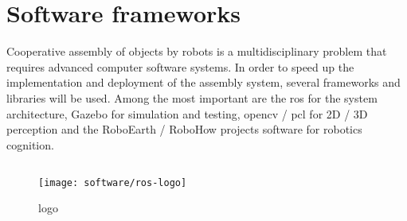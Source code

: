 %



\section{Software frameworks}

Cooperative assembly of objects by robots is a multidisciplinary problem that requires advanced computer software systems. In order to speed up the implementation and deployment of the assembly system, several frameworks and libraries will be used. Among the most important are the \gls{ros} for the system architecture, Gazebo for simulation and testing, \gls{opencv} / \gls{pcl} for 2D / 3D perception and the RoboEarth / RoboHow projects software for robotics cognition.

\subsection{}

\begin{wrapfigure}{r}{0.23\textwidth}
	\centering
	\vspace*{-2em}
	\texttt{[image: software/ros-logo]}
	\caption{ logo}
	\label{fig:ros-logo}
\end{wrapfigure}

